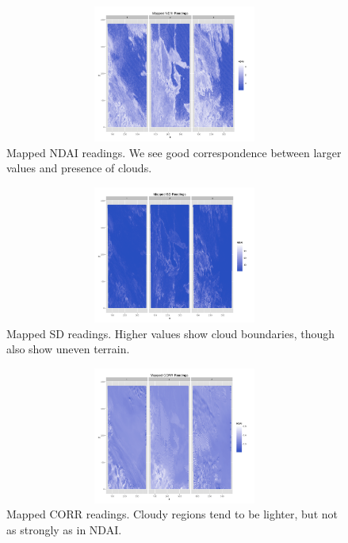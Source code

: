 \documentclass{article}\usepackage[]{graphicx}\usepackage[]{color}
\begin{document}
\begin{figure}[H]
\includegraphics[width = 18cm, height = 4.5cm]{NDAIEDA.png}
\caption{Mapped NDAI readings. We see good correspondence between larger values and presence of clouds.}
\end{figure}
\vspace{-8mm}
\begin{figure}[H]
\includegraphics[width = 18cm, height = 4.5cm]{SDEDA.png}
\caption{Mapped SD readings. Higher values show cloud boundaries, though also show uneven terrain.}
\end{figure}
\vspace{-8mm}
\begin{figure}[H]
\includegraphics[width = 18cm, height = 4.5cm]{CORREDA.png}
\caption{Mapped CORR readings. Cloudy regions tend to be lighter, but not as strongly as in NDAI.}
\end{figure}
\end{document}
